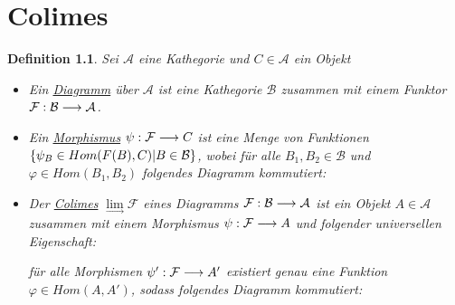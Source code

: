 \documentclass[10pt,a4paper]{report}
\newcommand{\comment}[1]{}
\newcounter{Aussage}[chapter]
\newtheorem{definition}[Aussage]{Definition}
\newcommand{\functionfront}[3]{\nolinebreak{#1:#2 \longrightarrow #3}}
\newcommand{\colimes}[0]{\lim\limits_{ \longrightarrow }}
\begin{document}
\chapter{Colimes}
\comment
{}
\begin{definition}
Sei $\mathcal{A}$ eine Kathegorie und $C \in \mathcal{A}$ ein Objekt
\begin{itemize}
\item Ein \underline{Diagramm} über $\mathcal{A}$ ist eine Kathegorie $\mathcal{B}$ zusammen mit einem Funktor $\functionfront{\mathcal{F}}{\mathcal{B}}{\mathcal{A}}$.
\item Ein \underline{Morphismus} $\functionfront{\psi}{\mathcal{F}}{C}$ ist eine Menge von Funktionen 
$\nolinebreak{\lbrace \psi_B \in Hom(F(B),C) \vert B \in \mathcal{B} \rbrace}$, wobei für alle $B_1,B_2 \in \mathcal{B}$ und $\varphi \in Hom(B_1,B_2)$ folgendes Diagramm kommutiert:
\begin{center}
\end{center}
\item Der \underline{Colimes} $\colimes \mathcal{F}$ eines Diagramms $\functionfront{\mathcal{F}}{\mathcal{B}}{\mathcal{A}}$ ist ein Objekt $A \in \mathcal{A}$ zusammen mit einem Morphismus $\functionfront{\psi}{\mathcal{F}}{A}$ und folgender universellen Eigenschaft:
\begin{center}
\comment{$\forall Morphismen \functionfront{\psi '}{\mathcal{F}}{\mathcal{A}'}\exists ! \varphi \in Hom_{\mathcal{A}}(A,A') \forall B \in \mathcal{B}: \varphi \circ \psi_B = \psi'_B $}

für alle Morphismen $\functionfront{\psi '}{\mathcal{F}}{A'}$ existiert genau eine Funktion $\varphi \in Hom(A,A')$, sodass folgendes Diagramm kommutiert:
\end{center}

\end{itemize}
\end{definition}
\end{document}
